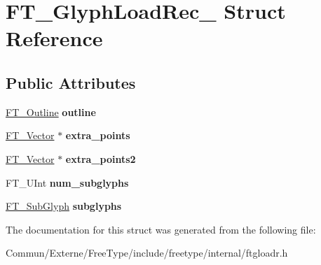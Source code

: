\hypertarget{struct_f_t___glyph_load_rec__}{}\section{F\+T\+\_\+\+Glyph\+Load\+Rec\+\_\+ Struct Reference}
\label{struct_f_t___glyph_load_rec__}
\subsection*{Public Attributes}
\begin{DoxyCompactItemize}
\item 
\hyperlink{struct_f_t___outline__}{F\+T\+\_\+\+Outline} {\bfseries outline}\hypertarget{struct_f_t___glyph_load_rec___ae340cdb5263322e86c640b15f82ea72a}{}\label{struct_f_t___glyph_load_rec___ae340cdb5263322e86c640b15f82ea72a}

\item 
\hyperlink{struct_f_t___vector__}{F\+T\+\_\+\+Vector} $\ast$ {\bfseries extra\+\_\+points}\hypertarget{struct_f_t___glyph_load_rec___ad2547bd6a7c7473d3a4646dfe908f1c3}{}\label{struct_f_t___glyph_load_rec___ad2547bd6a7c7473d3a4646dfe908f1c3}

\item 
\hyperlink{struct_f_t___vector__}{F\+T\+\_\+\+Vector} $\ast$ {\bfseries extra\+\_\+points2}\hypertarget{struct_f_t___glyph_load_rec___a5e8bbe62bd889e806700bc0d583ff79b}{}\label{struct_f_t___glyph_load_rec___a5e8bbe62bd889e806700bc0d583ff79b}

\item 
F\+T\+\_\+\+U\+Int {\bfseries num\+\_\+subglyphs}\hypertarget{struct_f_t___glyph_load_rec___a71dc4ab52b956b974fe65c95a098e03c}{}\label{struct_f_t___glyph_load_rec___a71dc4ab52b956b974fe65c95a098e03c}

\item 
\hyperlink{struct_f_t___sub_glyph_rec__}{F\+T\+\_\+\+Sub\+Glyph} {\bfseries subglyphs}\hypertarget{struct_f_t___glyph_load_rec___a12ef145fedbeb14cc8b9d320ae3fed96}{}\label{struct_f_t___glyph_load_rec___a12ef145fedbeb14cc8b9d320ae3fed96}

\end{DoxyCompactItemize}


The documentation for this struct was generated from the following file\+:\begin{DoxyCompactItemize}
\item 
Commun/\+Externe/\+Free\+Type/include/freetype/internal/ftgloadr.\+h\end{DoxyCompactItemize}
